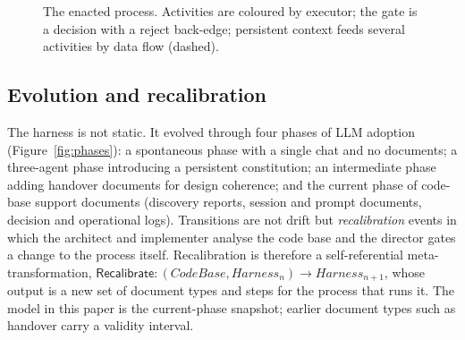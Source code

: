 \documentclass[sigconf]{acmart}
\begin{document}
\begin{figure}[t]
\centering
{}
\caption{The enacted process. Activities are coloured by executor; the gate is a decision with a reject back-edge; persistent context feeds several activities by data flow (dashed).}
\label{fig:proc}
\end{figure}

\subsection{Evolution and recalibration}
The harness is not static. It evolved through four phases of LLM adoption (Figure~\ref{fig:phases}): a spontaneous phase with a single chat and no documents; a three-agent phase introducing a persistent constitution; an intermediate phase adding handover documents for design coherence; and the current phase of code-base support documents (discovery reports, session and prompt documents, decision and operational logs). Transitions are not drift but \emph{recalibration} events in which the architect and implementer analyse the code base and the director gates a change to the process itself. Recalibration is therefore a self-referential meta-transformation,
\(\textsf{Recalibrate}: (\textit{CodeBase}, \textit{Harness}_n) \rightarrow \textit{Harness}_{n+1}\),
whose output is a new set of document types and steps for the process that runs it. The model in this paper is the current-phase snapshot; earlier document types such as handover carry a validity interval.
\end{document}

